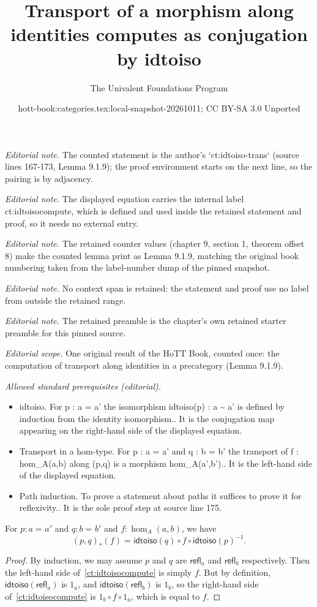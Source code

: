 \documentclass[10pt,a4paper]{article}
\title{Transport of a morphism along identities computes as conjugation by idtoiso}
\author{The Univalent Foundations Program}
\date{hott-book:categories.tex:local-snapshot-20261011; CC BY-SA 3.0 Unported}
\newcounter{chapter}
\newcommand{\id}[3][]{\ensuremath{#2 =_{#1} #3}\xspace}
\newcommand{\refl}[1]{\ensuremath{\mathsf{refl}_{#1}}\xspace}
\newcommand{\trans}[2]{\ensuremath{{#1}_{*}\mathopen{}\left({#2}\right)\mathclose{}}\xspace}
\newcommand{\inv}[1]{{#1}^{-1}}
\newcommand{\idtoiso}{\ensuremath{\mathsf{idtoiso}}\xspace}
\theoremstyle{definition}
\theoremstyle{remark}
\numberwithin{equation}{section}
\begin{document}
\maketitle
\setcounter{chapter}{9}
\setcounter{section}{1}
\setcounter{thm}{8}
\noindent\textit{Editorial note.} The counted statement is the author's `ct:idtoiso-trans` (source lines 167-173, Lemma 9.1.9); the proof environment starts on the next line, so the pairing is by adjacency.\par\medskip
\noindent\textit{Editorial note.} The displayed equation carries the internal label ct:idtoisocompute, which is defined and used inside the retained statement and proof, so it needs no external entry.\par\medskip
\noindent\textit{Editorial note.} The retained counter values (chapter 9, section 1, theorem offset 8) make the counted lemma print as Lemma 9.1.9, matching the original book numbering taken from the label-number dump of the pinned snapshot.\par\medskip
\noindent\textit{Editorial note.} No context span is retained: the statement and proof use no label from outside the retained range.\par\medskip
\noindent\textit{Editorial note.} The retained preamble is the chapter's own retained starter preamble for this pinned source.\par\medskip
\noindent\textit{Editorial scope.} One original result of the HoTT Book, counted once: the computation of transport along identities in a precategory (Lemma 9.1.9).\par\medskip
\noindent\textit{Allowed standard prerequisites (editorial).}\begin{itemize}
\item idtoiso. For p : a = a' the isomorphism idtoiso(p) : a \textasciitilde{} a' is defined by induction from the identity isomorphism.. It is the conjugation map appearing on the right-hand side of the displayed equation.
\item Transport in a hom-type. For p : a = a' and q : b = b' the transport of f : hom\_A(a,b) along (p,q) is a morphism hom\_A(a',b').. It is the left-hand side of the displayed equation.
\item Path induction. To prove a statement about paths it suffices to prove it for reflexivity.. It is the sole proof step at source line 175.
\end{itemize}\medskip
\begin{lem}\label{ct:idtoiso-trans}
  For $p:\id a a'$ and $q:\id b b'$ and $f:\hom_A(a,b)$, we have
  \begin{equation}\label{ct:idtoisocompute}
    \id{\trans{(p,q)}{f}}
    {\idtoiso(q)\circ f \circ \inv{\idtoiso(p)}}.
  \end{equation}
\end{lem}

\begin{proof}
  By induction, we may assume $p$ and $q$ are $\refl a$ and $\refl b$ respectively.
Then the left-hand side of~\eqref{ct:idtoisocompute} is simply $f$.
  But by definition, $\idtoiso(\refl a)$ is $1_a$, and $\idtoiso(\refl b)$ is $1_b$, so the right-hand side of~\eqref{ct:idtoisocompute} is $1_b\circ f\circ 1_a$, which is equal to $f$.
\end{proof}
\end{document}
